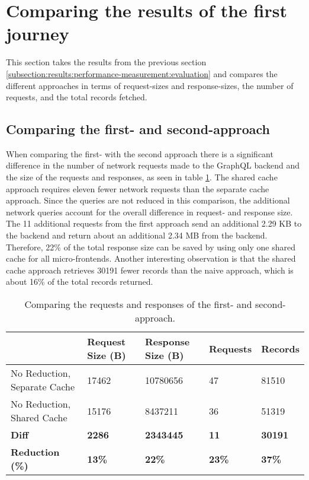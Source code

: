 
\section{Comparing the results of the first journey}\label{section:results:comparison}

This section takes the results from the previous section \ref{subsection:results:performance-measurement:evaluation} and compares the different approaches in terms of request-sizes and response-sizes, the number of requests, and the total records fetched.

\subsection{Comparing the first- and second-approach}\label{subsection:results:comparison-first-second-approach}

When comparing the first- with the second approach there is a significant difference in the number of network requests made to the GraphQL backend and the size of the requests and responses, as seen in table \ref{table:results:size-comparison-first-path-no-cache-no-reduction-cache-no-reduction}. The shared cache approach requires eleven fewer network requests than the separate cache approach. Since the queries are not reduced in this comparison, the additional network queries account for the overall difference in request- and response size. The 11 additional requests from the first approach send an additional 2.29 KB to the backend and return about an additional 2.34 MB from the backend. Therefore, 22\% of the total response size can be saved by using only one shared cache for all micro-frontends. Another interesting observation is that the shared cache approach retrieves 30191 fewer records than the naive approach, which is about 16\% of the total records returned.

\ifshowTables
\begin{table}[H]
    \begin{tabular}{|l|l|l|l|l|}
    \hline
      & Request Size (B) & Response Size (B) & Requests & Records \\
    \hline
     No Reduction, Separate Cache & 17462 & 10780656 & 47 & 81510 \\
     \hline
     No Reduction, Shared Cache & 15176 & 8437211 & 36 & 51319 \\
     \hline
     \hline
     \textbf{Diff} & \textbf{2286} & \textbf{2343445} & \textbf{11} & \textbf{30191} \\
     \hline
     \textbf{Reduction (\%)} & \textbf{13\%} & \textbf{22\%} & \textbf{23\%} & \textbf{37\%} \\
     \hline
    \end{tabular}
    \caption{Comparing the requests and responses of the first- and second-approach.}
    \label{table:results:size-comparison-first-path-no-cache-no-reduction-cache-no-reduction}
\end{table}
\fi


